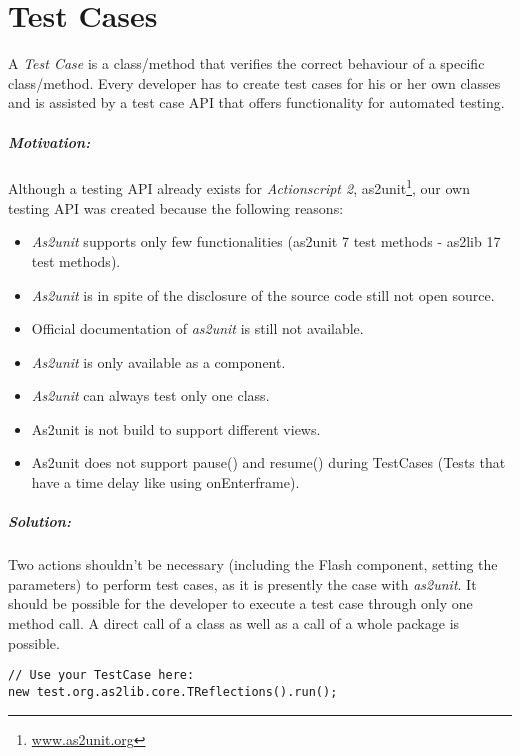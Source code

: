 \chapter{Test Cases}
\label{sec:TestCases}

A \emph{Test Case} is a class/method that verifies the correct behaviour of a specific class/method. Every developer has to create test cases for his or her own classes and is assisted by a test case API that offers functionality for automated testing.

\paragraph{Motivation:}
Although a testing API already exists for {\sl Actionscript 2}, as2unit\footnote{\href{http://www.as2unit.org}{www.as2unit.org}}, our own testing API was created because the following reasons:

\begin{itemize}
	\item {\sl As2unit} supports only few functionalities (as2unit 7 test methods - as2lib 17 test methods).
	\item {\sl As2unit} is in spite of the disclosure of the source code still not open source.
	\item Official documentation of {\sl as2unit} is still not available.
	\item {\sl As2unit} is only available as a component.
	\item {\sl As2unit} can always test only one class.
	\item { As2unit} is not build to support different views. 
	\item { As2unit} does not support pause() and resume() during TestCases (Tests that have a time delay like using onEnterframe). 
\end{itemize}

\paragraph{Solution:}

Two actions shouldn't be necessary (including the Flash component, setting the parameters) to perform test cases, as it is presently the case with {\sl as2unit}. It should be possible for the developer to execute a test case through only one method call. A direct call of a class as well as a call of a whole package is possible. 
\clearpage
\begin{lstlisting}[frame=single]
// Use your TestCase here:
new test.org.as2lib.core.TReflections().run();
\end{lstlisting}

